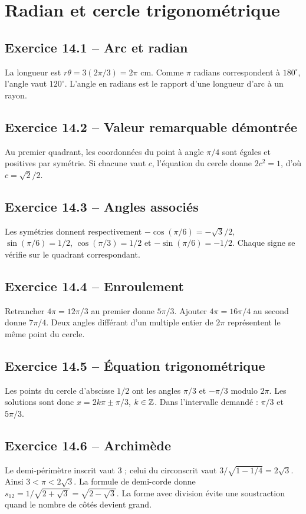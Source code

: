 \chapter{Radian et cercle trigonométrique}
\section*{Exercice 14.1 -- Arc et radian}
La longueur est $r\theta=3(2\pi/3)=2\pi$ cm. Comme $\pi$ radians correspondent à $180^\circ$, l'angle vaut $120^\circ$. L'angle en radians est le rapport d'une longueur d'arc à un rayon.

\section*{Exercice 14.2 -- Valeur remarquable démontrée}
Au premier quadrant, les coordonnées du point à angle $\pi/4$ sont égales et positives par symétrie. Si chacune vaut $c$, l'équation du cercle donne $2c^2=1$, d'où $c=\sqrt2/2$.

\section*{Exercice 14.3 -- Angles associés}
Les symétries donnent respectivement $-\cos(\pi/6)=-\sqrt3/2$, $\sin(\pi/6)=1/2$, $\cos(\pi/3)=1/2$ et $-\sin(\pi/6)=-1/2$. Chaque signe se vérifie sur le quadrant correspondant.

\section*{Exercice 14.4 -- Enroulement}
Retrancher $4\pi=12\pi/3$ au premier donne $5\pi/3$. Ajouter $4\pi=16\pi/4$ au second donne $7\pi/4$. Deux angles différant d'un multiple entier de $2\pi$ représentent le même point du cercle.

\section*{Exercice 14.5 -- Équation trigonométrique}
Les points du cercle d'abscisse $1/2$ ont les angles $\pi/3$ et $-\pi/3$ modulo $2\pi$. Les solutions sont donc $x=2k\pi\pm\pi/3$, $k\in\mathbb{Z}$. Dans l'intervalle demandé : $\pi/3$ et $5\pi/3$.

\section*{Exercice 14.6 -- Archimède}
Le demi-périmètre inscrit vaut $3$ ; celui du circonscrit vaut $3/\sqrt{1-1/4}=2\sqrt3$. Ainsi $3<\pi<2\sqrt3$. La formule de demi-corde donne $s_{12}=1/\sqrt{2+\sqrt3}=\sqrt{2-\sqrt3}$. La forme avec division évite une soustraction quand le nombre de côtés devient grand.
